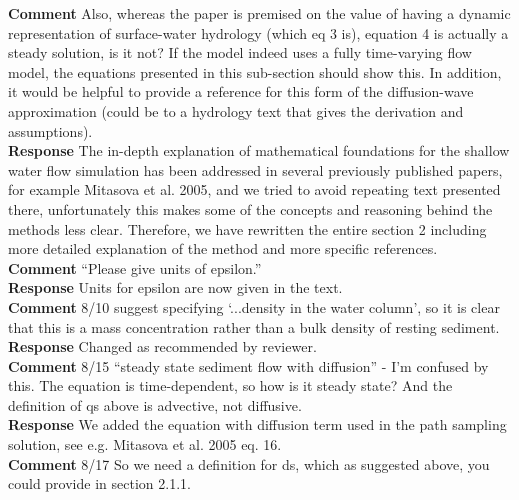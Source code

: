 \documentclass[gmd, manuscript]{copernicus}
\begin{document}
\noindent\textbf{Comment}
Also, whereas the paper is premised on the value of having a dynamic representation of surface-water hydrology (which eq 3 is), equation 4 is actually a steady solution, is it not? If the model indeed uses a fully time-varying flow model, the equations presented in this sub-section should show this. In addition, it would be helpful to provide a reference for this form of the diffusion-wave approximation (could be to a hydrology text that gives the derivation and assumptions).
\\

\noindent\textbf{Response}
The in-depth explanation of mathematical foundations for the shallow water flow simulation has been addressed in several previously published papers, for example Mitasova et al. 2005, and we tried to avoid repeating text presented there, unfortunately this makes some of the concepts and reasoning behind the methods less clear.  Therefore, we have rewritten the entire section 2 including more detailed explanation of the method and more specific references.\\

\noindent\textbf{Comment}
“Please give units of epsilon.”
\\

\noindent\textbf{Response}
Units for epsilon are now given in the text.
\\

\noindent\textbf{Comment}
8/10 suggest specifying `...density in the water column', so it is clear that this is a mass concentration rather than a bulk density of resting sediment.
\\

\noindent\textbf{Response}
Changed as recommended by reviewer. 
\\

\noindent\textbf{Comment}
8/15 ``steady state sediment flow with diffusion'' - I’m confused by this. The equation is time-dependent, so how is it steady state? And the definition of qs above is advective, not diffusive. 
\\

\noindent\textbf{Response}
We added the  equation with diffusion term used in the path sampling solution, see e.g. Mitasova et al. 2005 eq. 16.
\\

\noindent\textbf{Comment}
8/17 So we need a definition for ds, which as suggested above, you could provide in section 2.1.1.
\\
\end{document}
